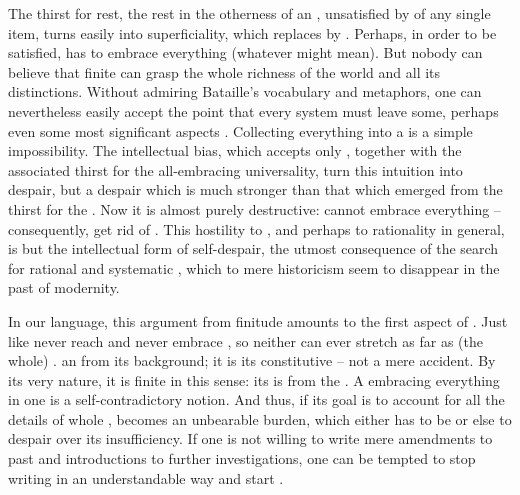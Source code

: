 \pa The thirst for rest, the rest in the otherness of an ,
unsatisfied by  of any single item, turns easily into
superficiality,  which replaces  by . 
Perhaps, in order to be satisfied,  has to embrace everything
(whatever  might mean).  But 
nobody can believe that finite  can grasp the whole
richness of the world and all its distinctions.
Without admiring Bataille's vocabulary and metaphors, one can nevertheless easily
accept the point that every system must leave some, perhaps even some most
significant aspects . Collecting everything into a  is a simple impossibility.  The intellectual bias, which accepts
only , together with the associated thirst for the
all-embracing universality, turn this intuition into despair, but a despair
which is much stronger 
than that which emerged from the thirst for the . Now it is
almost purely destructive:  cannot embrace everything --
consequently, get rid of . This  
hostility to , and perhaps to rationality in general, is but the
intellectual form of  self-despair, the 
utmost consequence of the search for rational  and systematic
, which to mere historicism seem to disappear in the past of modernity. 

In our language, this argument from finitude amounts to the first aspect of
.  Just like  never reach 
and  never embrace , so neither can 
ever stretch as far as (the whole) . 
 an  from its background; it is its constitutive
 -- not a mere accident. By its very nature, it is finite in this
sense: its  is  from the . A 
embracing everything in one  is a self-contradictory notion.  And thus,
if its goal is to account for all the details of whole ,
 becomes an unbearable burden, which either has to be
 or else to despair over its insufficiency. If one is not willing
to write mere amendments to past and introductions to further investigations,
one can be tempted to stop writing in an understandable way and start
.

